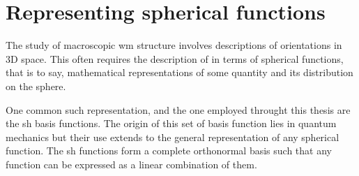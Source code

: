 \section{Representing spherical functions}
\label{sec:sh}

The study of macroscopic \gls{wm} structure involves descriptions of orientations in 3D space.
This often requires the description of in terms of spherical functions, that is to say, mathematical representations of some quantity and its distribution on the sphere.

One common such representation, and the one employed throught this thesis are the \gls{sh} basis functions.
The origin of this set of basis function lies in quantum mechanics  but their use extends to the general representation of any spherical function.
The \gls{sh} functions form a complete orthonormal basis such that any  function can be expressed as a linear combination of them.

